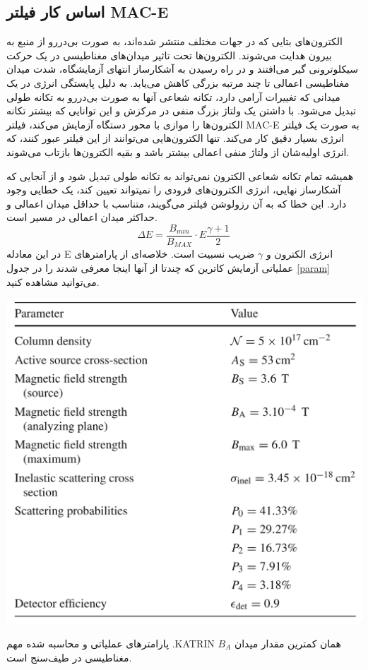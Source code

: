 \documentclass[a4paper,11pt,oneside,openany]{iut-thesis}
\begin{document}
\subsection{
اساس کار فیلتر MAC-E
}
الکترون‌های بتایی که در جهات مختلف منتشر شده‌اند، به صورت بی‌دررو از منبع به بیرون هدایت می‌شوند. الکترون‌ها تحت تاثیر میدان‌های مغناطیسی در یک حرکت سیکلوترونی گیر می‌افتند و در راه رسیدن به آشکارساز انتهای آزمایشگاه، شدت میدان مغناطیسی اعمالی تا چند مرتبه بزرگی کاهش می‌یابد. به دلیل پایستگی انرژی در یک میدانی که تغییرات آرامی دارد، تکانه شعاعی آنها به صورت بی‌دررو به تکانه طولی تبدیل می‌شود. با داشتن یک ولتاژ بزرگ منفی در مرکزش و این توانایی که بیشتر تکانه الکترون‌ها را موازی با محور دستگاه آزمایش می‌کند، فیلتر MAC-E به صورت یک فیلتر انرژی بسیار دقیق کار می‌کند. تنها الکترون‌هایی می‌توانند از این فیلتر عبور کنند، که انرژی اولیه‌شان از ولتاژ منفی اعمالی بیشتر باشد و بقیه الکترون‌ها بازتاب می‌شوند.

همیشه تمام تکانه شعاعی الکترون نمی‌تواند به تکانه طولی تبدیل شود و از آنجایی که آشکارساز نهایی، انرژی الکترون‌های فرودی را نمیتواند تعیین کند، یک خطایی وجود دارد. این خطا که به آن رزولوشن فیلتر می‌گویند، متناسب با حداقل میدان اعمالی و حداکثر میدان اعمالی در مسیر است.
\begin{equation}
\Delta E = \frac{B_{min}}{B_{MAX}} \cdot E \frac{\gamma + 1}{2}\,
\end{equation}
در این معادله E انرژی الکترون و $\gamma$ ضریب نسبیت است. خلاصه‌ای از پارامترهای عملیاتی آزمایش کاترین که چندتا از آنها اینجا معرفی شدند را در جدول 
\ref{param}
 می‌توانید مشاهده کنید.

\begin{table}
	\includegraphics[width=0.7\linewidth]{params}
	\caption{
پارامترهای عملیاتی و محاسبه شده مهم .KATRIN
$B_{A}$ 
همان کمترین مقدار میدان مغناطیسی در طیف‌سنج است.	
}
	\label{param}
\end{table}
\end{document}
